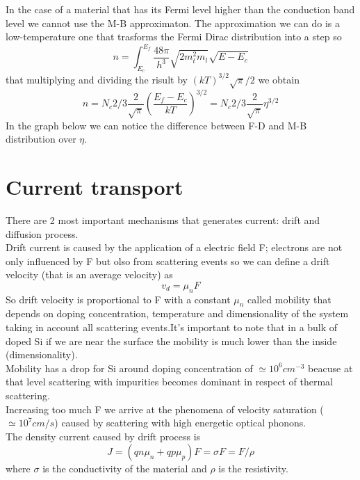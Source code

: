 In the case of a material that has its Fermi level higher than the conduction band level we cannot use the M-B approximaton. The approximation we can do is a low-temperature one that trasforms the Fermi Dirac distribution into a step so
\begin{equation}
n=\int^{E_f}_{E_c}\frac{48\pi}{h^3}\sqrt{2m_t^2m_l}\sqrt{E-E_c}
\end{equation}
that multiplying and dividing the risult by $(kT)^{3/2}\sqrt{\pi}/2$ we obtain
\begin{equation}
n=N_c 2/3 \frac{2}{\sqrt{\pi}}\left(\frac{E_f-E_c}{kT}\right)^{3/2}=N_c 2/3 \frac{2}{\sqrt{\pi}}\eta^{3/2}
\end{equation}
In the graph below we can notice the difference between F-D and M-B distribution over $\eta$.\\
\section{Current transport}
There are 2 most important mechanisms that generates current: drift and diffusion process.\\
Drift current is caused by the application of a electric field F; electrons are not only influenced by F but olso from scattering events so we can define a drift velocity (that is an average velocity) as 
\begin{equation}
v_d=\mu_n F
\end{equation}
So drift velocity is proportional to F with a constant $\mu_n$ called mobility that depends on doping concentration, temperature and dimensionality of the system taking in account all scattering events.It's important to note that in a bulk of doped Si if we are near the surface the mobility is much lower than the inside (dimensionality).\\
Mobility has a drop for Si around doping concentration of $\simeq 10^6 cm^{-3}$ beacuse at that level scattering with impurities becomes dominant in respect of thermal scattering.\\
Increasing too much F we arrive at the phenomena of velocity saturation ($\simeq 10^7 cm/s$) caused by scattering with high energetic optical phonons.\\
The density current caused by drift process is 
\begin{equation}
J=(qn\mu_n + qp\mu_p)F=\sigma F=F/\rho
\end{equation}
where $\sigma$ is the conductivity of the material and $\rho$ is the resistivity.\\

